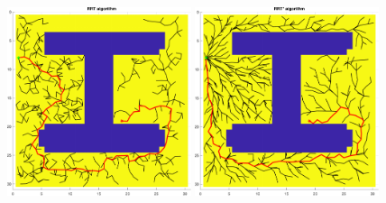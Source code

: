 \begin{figure}[H]
    \centering
    \includegraphics[width=0.48\textwidth]{./img/MATLAB/testing/04_RRT.pdf}
    \hspace{6pt}
    \includegraphics[width=0.48\textwidth]{./img/MATLAB/testing/04_RRT Star.pdf}

    \vspace{11pt}


\end{figure}
